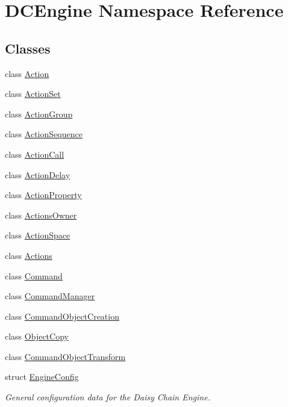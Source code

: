 \hypertarget{namespaceDCEngine}{\section{D\-C\-Engine Namespace Reference}
\label{namespaceDCEngine}
}
\subsection*{Classes}
\begin{DoxyCompactItemize}
\item 
class \hyperlink{classDCEngine_1_1Action}{Action}
\item 
class \hyperlink{classDCEngine_1_1ActionSet}{Action\-Set}
\item 
class \hyperlink{classDCEngine_1_1ActionGroup}{Action\-Group}
\item 
class \hyperlink{classDCEngine_1_1ActionSequence}{Action\-Sequence}
\item 
class \hyperlink{classDCEngine_1_1ActionCall}{Action\-Call}
\item 
class \hyperlink{classDCEngine_1_1ActionDelay}{Action\-Delay}
\item 
class \hyperlink{classDCEngine_1_1ActionProperty}{Action\-Property}
\item 
class \hyperlink{classDCEngine_1_1ActionsOwner}{Actions\-Owner}
\item 
class \hyperlink{classDCEngine_1_1ActionSpace}{Action\-Space}
\item 
class \hyperlink{classDCEngine_1_1Actions}{Actions}
\item 
class \hyperlink{classDCEngine_1_1Command}{Command}
\item 
class \hyperlink{classDCEngine_1_1CommandManager}{Command\-Manager}
\item 
class \hyperlink{classDCEngine_1_1CommandObjectCreation}{Command\-Object\-Creation}
\item 
class \hyperlink{classDCEngine_1_1ObjectCopy}{Object\-Copy}
\item 
class \hyperlink{classDCEngine_1_1CommandObjectTransform}{Command\-Object\-Transform}
\item 
struct \hyperlink{structDCEngine_1_1EngineConfig}{Engine\-Config}
\begin{DoxyCompactList}\small\item\em General configuration data for the Daisy Chain Engine. \end{DoxyCompactList}\item 

\end{DoxyCompactItemize}
